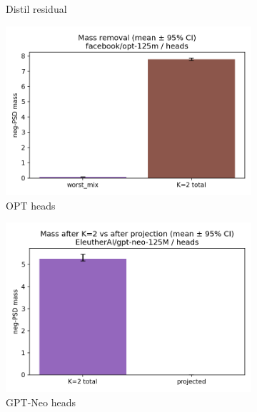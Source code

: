 \documentclass[11pt]{article}
\newcommand{\1}{\mathbf{1}}
\begin{document}
\begin{figure}[t]
\begin{subfigure}[t]{0.32\textwidth}
\caption{Distil residual}
\end{subfigure}

\vspace{0.5em}

\begin{subfigure}[t]{0.32\textwidth}
\includegraphics[width=\linewidth]{figs/mass_removal_facebook_opt-125m_heads.png}
\caption{OPT heads}
\end{subfigure}\hfill
\begin{subfigure}[t]{0.32\textwidth}
\includegraphics[width=\linewidth]{figs/mass_panel_EleutherAI_gpt-neo-125M_heads.png}
\caption{GPT-Neo heads}
\end{subfigure}\hfill
\begin{subfigure}[t]{0.32\textwidth}

\end{subfigure}
\end{figure}
\end{document}

